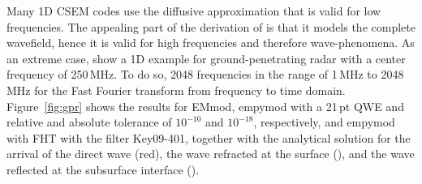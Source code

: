 \documentclass[manuscript,revised]{geophysics}
\begin{document}
Many 1D CSEM codes use the diffusive approximation that is valid for low
frequencies. The appealing part of the derivation of
\cite{GEO.15.Hunziker} is that it models the complete wavefield,
hence it is  valid for high frequencies and therefore wave-phenomena.
As an extreme case, \cite{GEO.15.Hunziker} show a 1D example for
ground-penetrating radar with a center frequency of 250\,MHz. To do so,
 2048
frequencies in the range of 1\,MHz to 2048\,MHz  for the
Fast Fourier transform from frequency to time domain.   Figure~\ref{fig:gpr} shows  the  results for EMmod, 
empymod with a 21\,pt QWE and relative and absolute tolerance of $10^{-10}$
and $10^{-18}$, respectively, and empymod with FHT with the filter Key09-401,
together with the analytical solution for the arrival of the direct wave (red),
the wave refracted at the surface (), and the wave
reflected at the subsurface interface ().  
\end{document}
